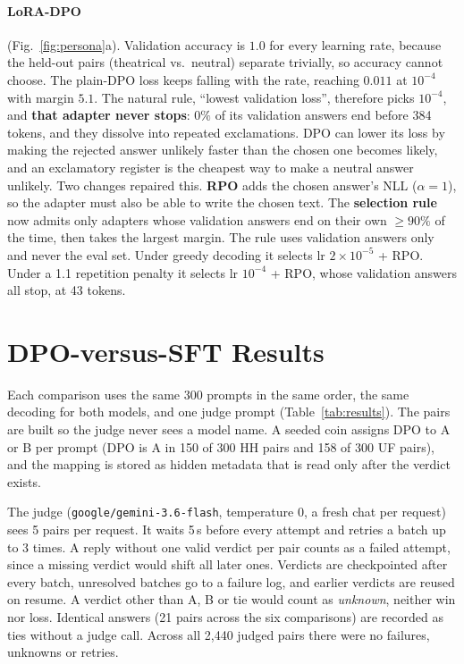 \documentclass{article}
\begin{document}
\paragraph{LoRA-DPO} (Fig.~\ref{fig:persona}a). Validation accuracy is $1.0$ for every learning rate, because the
held-out pairs (theatrical vs.\ neutral) separate trivially, so accuracy cannot choose. The plain-DPO loss keeps
falling with the rate, reaching $0.011$ at $10^{-4}$ with margin $5.1$. The natural rule, ``lowest validation loss'',
therefore picks $10^{-4}$, and \textbf{that adapter never stops}: $0\%$ of its validation answers end before 384
tokens, and they dissolve into repeated exclamations. DPO can lower its loss by making the rejected answer unlikely
faster than the chosen one becomes likely, and an exclamatory register is the cheapest way to make a neutral answer
unlikely. Two changes repaired this. \textbf{RPO} \citep{pang2024irpo} adds the chosen answer's NLL ($\alpha=1$), so
the adapter must also be able to write the chosen text. The \textbf{selection rule} now admits only adapters whose
validation answers end on their own $\ge90\%$ of the time, then takes the largest margin. The rule uses validation
answers only and never the eval set. Under greedy decoding it selects lr $2\times10^{-5}$ + RPO. Under a 1.1
repetition penalty it selects lr $10^{-4}$ + RPO, whose validation answers all stop, at 43 tokens.

\section{DPO-versus-SFT Results}
\label{sec:results}



Each comparison uses the same 300 prompts in the same order, the same decoding for both models, and one judge prompt
(Table~\ref{tab:results}). The pairs are built so the judge never sees a model name. A seeded coin assigns DPO to A or
B per prompt (DPO is A in 150 of 300 HH pairs and 158 of 300 UF pairs), and the mapping is stored as hidden metadata
that is read only after the verdict exists.

The judge (\texttt{google/gemini-3.6-flash}, temperature 0, a fresh chat per request) sees 5 pairs per request. It
waits 5\,s before every attempt and retries a batch up to 3 times. A reply without one valid verdict per pair counts as
a failed attempt, since a missing verdict would shift all later ones. Verdicts are checkpointed after every batch,
unresolved batches go to a failure log, and earlier verdicts are reused on resume. A verdict other than A, B or tie
would count as \emph{unknown}, neither win nor loss. Identical answers (21 pairs across the six comparisons) are
recorded as ties without a judge call. Across all 2{,}440 judged pairs there were no failures, unknowns or retries.
\end{document}
